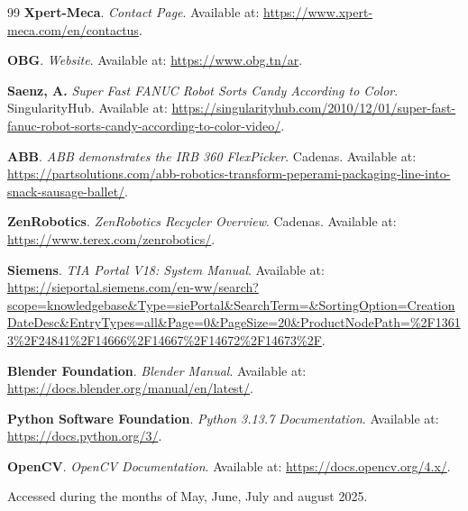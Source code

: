 \begin{thebibliography}{99}
\label{sec:bibliography}
\textbf{Xpert-Meca}. \textit{Contact Page}. Available at: \url{https://www.xpert-meca.com/en/contactus}.

\textbf{OBG}. \textit{Website}. Available at: \url{https://www.obg.tn/ar}.

\textbf{Saenz, A.} \textit{Super Fast FANUC Robot Sorts Candy According to Color}. SingularityHub. Available at: \url{https://singularityhub.com/2010/12/01/super-fast-fanuc-robot-sorts-candy-according-to-color-video/}.

\textbf{ABB}. \textit{ABB demonstrates the IRB 360 FlexPicker}. Cadenas. Available at: \url{https://partsolutions.com/abb-robotics-transform-peperami-packaging-line-into-snack-sausage-ballet/}.

\textbf{ZenRobotics}. \textit{ZenRobotics Recycler Overview}. Cadenas. Available at: \url{https://www.terex.com/zenrobotics/}.

\textbf{Siemens}. \textit{TIA Portal V18: System Manual}. Available at: \url{https://sieportal.siemens.com/en-ww/search?scope=knowledgebase&Type=siePortal&SearchTerm=&SortingOption=CreationDateDesc&EntryTypes=all&Page=0&PageSize=20&ProductNodePath=%2F13613%2F24841%2F14666%2F14667%2F14672%2F14673%2F}.

\textbf{Blender Foundation}. \textit{Blender Manual}. Available at: \url{https://docs.blender.org/manual/en/latest/}.

\textbf{Python Software Foundation}. \textit{Python 3.13.7 Documentation}. Available at: \url{https://docs.python.org/3/}.

\textbf{OpenCV}. \textit{OpenCV Documentation}. Available at: \url{https://docs.opencv.org/4.x/}.

\end{thebibliography}

\vspace{1em} %
\noindent Accessed during the months of May, June, July and august 2025.